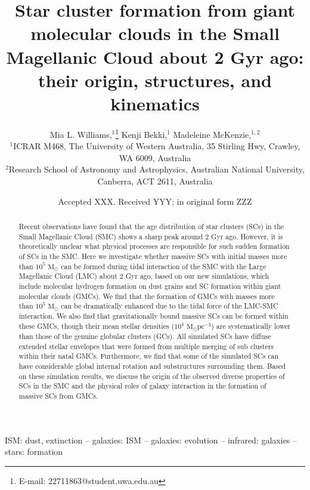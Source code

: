 \documentclass[fleqn,usenatbib]{mnras}
\title[Simulations of Massive Star Clusters]{Star cluster formation from giant molecular clouds in the Small Magellanic Cloud about 2 Gyr ago: their origin, structures, and kinematics}
\author[M. Williams, K. Bekki \& M. McKenzie]{
Mia L. Williams,$^{1}$\thanks{E-mail: 22711863@student.uwa.edu.au}
Kenji Bekki,$^{1}$
Madeleine McKenzie,$^{1,2}$
\\
$^{1}$ICRAR M468, The University of Western Australia, 35 Stirling Hwy, Crawley, WA 6009, Australia\\
$^{2}$Research School of Astronomy and Astrophysics, Australian National University, Canberra, ACT 2611, Australia\\
}
\date{Accepted XXX. Received YYY; in original form ZZZ}
\begin{document}
\label{firstpage}
\pagerange{\pageref{firstpage}--\pageref{lastpage}}
\maketitle

\begin{abstract}
    Recent observations have found that the age distribution of star clusters (SCs) in the Small Magellanic Cloud (SMC) shows a sharp peak around 2 Gyr ago. However, it is theoretically unclear what physical processes are responsible for such sudden formation of SCs in the SMC. Here we investigate whether massive SCs with initial masses more than $10^5$ $\text{M}_\odot$ can be formed during tidal interaction of the SMC with the Large Magellanic Cloud (LMC) about 2 Gyr ago, based on our new simulations, which include molecular hydrogen formation on dust grains and SC formation within giant molecular clouds (GMCs). We find that the formation of GMCs with masses more than $10^5$ $\text{M}_\odot$ can be dramatically enhanced due to the tidal force of the LMC-SMC interaction. We also find that gravitationally bound massive SCs can be formed within these GMCs, though their mean stellar densities ($10^4$ $\text{M}_\odot \text{pc}^{-3}$) are systematically lower than those of the genuine globular clusters (GCs). All simulated SCs have diffuse extended stellar envelopes that were formed from multiple merging of sub clusters within their natal GMCs. Furthermore, we find that some of the simulated SCs can have considerable global internal rotation and substructures surrounding them. Based on these simulation results, we discuss the origin of the observed diverse properties of SCs in the SMC and the physical roles of galaxy interaction in the formation of massive SCs from GMCs.
\end{abstract}

\begin{keywords}
ISM: dust, extinction --
galaxies: ISM --
galaxies: evolution --
infrared: galaxies  --
stars: formation
\end{keywords}


\end{document}
